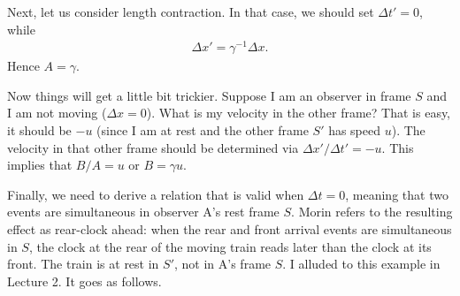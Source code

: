 \documentclass[12pt]{article}
\newcommand{\be}{\begin{eqnarray}}
\newcommand{\ee}{\end{eqnarray}}
\begin{document}
Next, let us consider length contraction. In that case, we should set $\Delta t' = 0$, while
\be
\Delta x' = \gamma^{-1} \Delta x.
\ee
Hence $A = \gamma$.

Now things will get a little bit trickier. Suppose I am an observer in frame $S$ and I am not moving ($\Delta x = 0$). What is my velocity in the other frame? That is easy, it should be $-u$ (since I am at rest and the other frame $S'$ has speed $u$). The velocity in that other frame should be determined via $\Delta x'/\Delta t' = -u$. This implies that $B/A = u$ or $B = \gamma u$.

Finally, we need to derive a relation that is valid when $\Delta t = 0$, meaning that two events are simultaneous in observer A's rest frame $S$. Morin refers to the resulting effect as rear-clock ahead: when the rear and front arrival events are simultaneous in $S$, the clock at the rear of the moving train reads later than the clock at its front. The train is at rest in $S'$, not in A's frame $S$. I alluded to this example in Lecture 2. It goes as follows.
\end{document}

